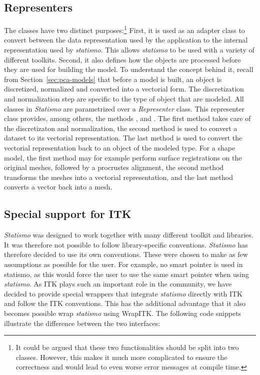 \documentclass{InsightArticle}
\newcommand{\statismo}{\emph{statismo}\xspace}
\newcommand{\Statismo}{\emph{Statismo}\xspace}
\begin{document}
\subsection{Representers} \label{sec:representers}
The  classes have two distinct purposes:\footnote{
  It could be argued that these two functionalities should be split into two classes. However, this
  makes it much more complicated to ensure the correctness and would lead to even worse error messages
  at compile time.}
First, it is used as an adapter class to convert between the data representation used by the application 
to the internal representation used by \statismo. This allows \statismo to be used with a variety of different toolkits. Second, it also defines how the objects are processed before they are used for building the model.
To  understand the concept behind it, recall from Section~\ref{sec:pca-models}
that before a model is built, an object is discretized, normalized and converted into a vectorial form.
The discretization and normalization step are specific to the type of
object that are modeled.  All classes in \Statismo are parametrized over
a \emph{Representer} class. This representer class provides, among others, the methods
,  and . 
The first method takes care of the discretizaton and normalization, the second method is used to convert a dataset to its vectorial representation. 
The last method is used to convert the vectorial representation back to an object of the modeled type. For a shape model, the first method may for example perform surface registrations on the original meshes,  
followed by a procrustes alignment, the second method transforms the meshes into a vectorial representation, and the last method converts a vector back into a mesh.

\subsection{Special support for ITK}
\Statismo was designed to work together with many different toolkit
and libraries. It was therefore not possible to follow library-specific
conventions. \Statismo has therefore decided to use its own conventions. These
were chosen to make as few assumptions as possible for the user. For example, no smart pointer is used in statismo, as
this would force the user to use the same smart pointer when using
\statismo. As ITK plays such an important role in the community, we
have decided to provide special wrappers that integrate \statismo
directly with ITK and follow the ITK conventions.  This has the
additional advantage that it also becomes possible wrap \statismo
using WrapITK.  The following code snippets illustrate the difference
between the two interfaces:
\end{document}
